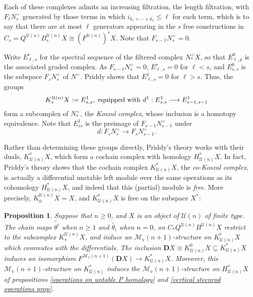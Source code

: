 \documentclass[11pt]{amsart} \renewcommand{\baselinestretch}{1.2}
\theoremstyle{plain}
\newtheorem{prop}[thm]{Proposition}
\theoremstyle{definition}
\renewcommand{\to}{\longrightarrow}
\newcommand{\calU}{\mathcal{U}}
\newcommand{\calMv}{\mathcal{M}\dver}
\newcommand{\Nop}{N^{\smash{-}}}
\newcommand{\dver}{_\mathrm{v}}
\newcommand{\dual}{\mathbf{D}}
\begin{document}
\begin{Koszul complexes}
Each of these complexes admits an increasing filtration, the length filtration, with $F_\ell N^\div_s$ generated by those terms in which $i_{k_s+\cdots +k_1}\leq \ell$ for each term, which is to say that there are at most $\ell$ generators appearing in the $s$ free constructions in $C_s= Q^{\calU(n)}B^{\calU(n)}_sX\cong (F^{\calU(n)})^sX$. Note that $F_{s-1}N^\div_s=0$. %

Write $E^r_{\ell,s}$ for the spectral sequence of the filtered complex $N^\div_*X$, so that $E^0_{\ell,p}$ is the associated graded complex. As $F_{s-1} N^\div_s=0$, $E^r_{\ell,s}=0$ for $\ell<s$, and $E^0_{s,s}$ is the subspace $F_sN^\div_s$ of $N^\div$. %
Priddy \cite[Proof of Theorem 5.3]{PriddyKoszul.pdf} shows that $E^1_{\ell,s}=0$  for $\ell>s$. Thus, the groups
\[K_s^{\calU(n)}X:=E^1_{s,s}, \textup{ equipped with $d^1:E^1_{s,s}\to E^1_{s-1,s-1}$}\]
form a subcomplex of $N^\div_*$, the \emph{Koszul complex}, whose inclusion is a homotopy equivalence. Note that $E^1_{ss}$ is the preimage of $F_{s-1}N^\div_{s-1}$ under
\[d:F_{s}N^\div_{s}\to F_{s}N^\div_{s-1}.\]


Rather than determining these groups directly, Priddy's theory works with their duals, $K^*_{\calU(n)}X$, which form a cochain complex with homology $H^*_{\calU(n)}X$. In fact, Priddy's theory shows that the cochain complex $K^*_{\calU(n)}X$, the \emph{co-Koszul complex}, is actually a differential unstable left module over the same operations as its cohomology $H^*_{\calU(n)}X$, and indeed that this (partial) module is \emph{free}. More precisely,  $K_0^{\calU(n)}X= X$, and $K^*_{\calU(n)}X$ is free on the  subspace $X^*$:
\begin{prop}
\label{the cokoszul complex is free}
Suppose that $n\geq0$, and $X$ is an object of $\calU(n)$ of finite type. The chain maps $\widetilde{\theta^i}$ when $n\geq1$ and $\widetilde{\theta_i}$ when $n=0$, on $C_*Q^{\calU(n)}B^{\calU(n)}X$ restrict to the subcomplex $K_*^{\calU(n)}X$, and induce an $\calMv(n+1)$-structure on $K^*_{\calU(n)}X$ which commutes with the differentials. The inclusion $\dual X\cong K^0_{\calU(n)}X\subseteq K^*_{\calU(n)}X$ induces an isomorphism $F^{\calMv(n+1)}(\dual X)\to K^*_{\calU(n)}X$. Moreover, this $\calMv(n+1)$-structure on $K^*_{\calU(n)}$ induces the $\calMv(n+1)$-structure on $H^*_{\calU(n)}X$ of propositions \ref{operations on untable P homology} and \ref{vertical steenrod operations prop}.
\end{prop}



\end{Koszul complexes}
\end{document}
